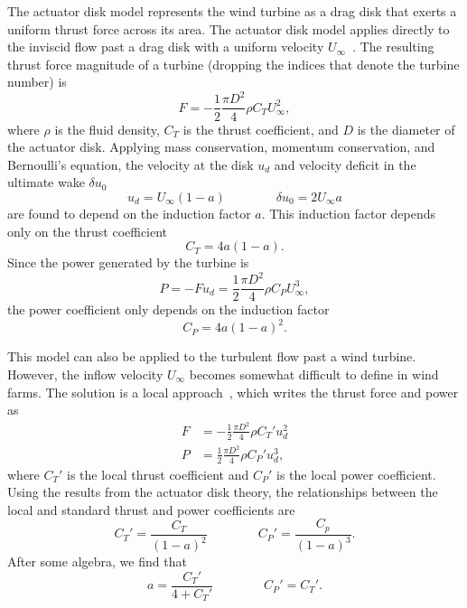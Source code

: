 The actuator disk model represents the wind turbine as a drag disk that exerts a uniform thrust force across its area. The actuator disk model applies directly to the inviscid flow past a drag disk with a uniform velocity $U_\infty$~\cite{Glauert1935a, Glauert1947a, Burton2011a}. The resulting thrust force magnitude of a turbine (dropping the indices that denote the turbine number) is
\begin{equation}
F = - \frac{1}{2} \frac{\pi D^2}{4} \rho C_T U_\infty^2,
\end{equation}
where $\rho$ is the fluid density, $C_T$ is the thrust coefficient, and $D$ is the diameter of the actuator disk. Applying mass conservation, momentum conservation, and Bernoulli's equation, the velocity at the disk $u_d$ and velocity deficit in the ultimate wake $\delta u_0$ 
\begin{equation}
u_d = U_\infty(1-a) \qquad \qquad \delta u_0 = 2 U_\infty a
\end{equation}
are found to depend on the induction factor $a$. This induction factor depends only on the thrust coefficient 
\begin{equation}
C_T= 4a(1-a).
\end{equation}
Since the power generated by the turbine is
\begin{equation}
P = -F u_d = \frac{1}{2} \frac{\pi D^2}{4} \rho C_P U_\infty^3,
\end{equation}
the power coefficient only depends on the induction factor
\begin{equation}
C_P= 4a(1-a)^2.
\end{equation}

This model can also be applied to the turbulent flow past a wind turbine. However, the inflow velocity $U_\infty$ becomes somewhat difficult to define in wind farms. The solution is a local approach~\cite{Meyers2010a, Calaf2010a}, which writes the thrust force and power as
\begin{align}
F &= -\frac{1}{2} \frac{\pi D^2}{4} \rho C_T' u_d^2\\
P &= \frac{1}{2} \frac{\pi D^2}{4} \rho C_P' u_d^3,
\end{align}
where $C_T'$ is the local thrust coefficient and $C_P'$ is the local power coefficient. Using the results from the actuator disk theory, the relationships between the local and standard thrust and power coefficients are
\begin{equation}
C_T' = \frac{C_T}{(1-a)^2} \qquad \qquad C_P' = \frac{C_p}{(1-a)^3}.
\end{equation}
After some algebra, we find that
\begin{equation}
a = \frac{C_T'}{4 + C_T'} \qquad \qquad C_P' = C_T'.
\end{equation}

